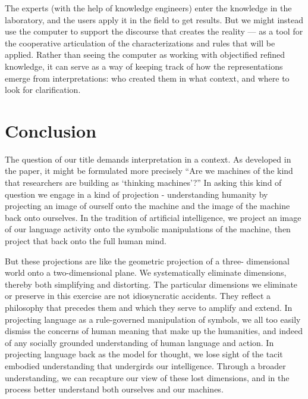 \documentclass[12pt]{article}
\begin{document}
The experts (with the help of knowledge engineers) enter the knowledge in the laboratory, and the users apply it in the field to get results. But we might instead use the computer to support the discourse that creates the reality --- as a tool for the cooperative articulation of the characterizations and rules that will be applied. Rather than seeing the computer as working with objectified refined knowledge, it can serve as a way of keeping track of how the representations emerge from interpretations: who created them in what context, and where to look for clarification.

\section{Conclusion}

The question of our title demands interpretation in a context. As developed in the paper, it might be formulated more precisely “Are we machines of the kind that researchers are building as ‘thinking machines’?” In asking this kind of question we engage in a kind of projection - understanding humanity by projecting an image of ourself onto the machine and the image of the machine back onto ourselves. In the tradition of artificial intelligence, we project an image of our language activity onto the symbolic manipulations of the machine, then project that back onto the full human mind.

But these projections are like the geometric projection of a three- dimensional world onto a two-dimensional plane. We systematically eliminate dimensions, thereby both simplifying and distorting. The particular dimensions we eliminate or preserve in this exercise are not idiosyncratic accidents. They reflect a philosophy that precedes them and which they serve to amplify and extend. In projecting language as a rule-governed manipulation of symbols, we all too easily dismiss the concerns of human meaning that make up the humanities, and indeed of any socially grounded understanding of human language and action. In projecting language back as the model for thought, we lose sight of the tacit embodied understanding that undergirds our intelligence. Through a broader understanding, we can recapture our view of these lost dimensions, and in the process better understand both ourselves and our machines.
\end{document}
